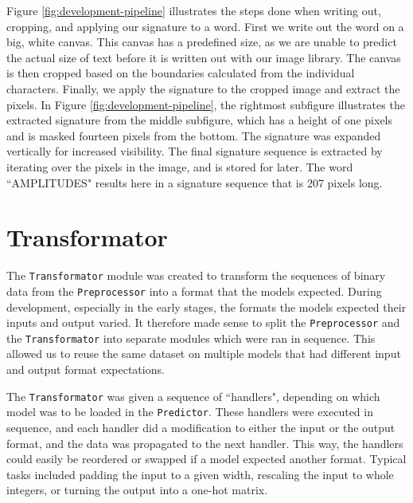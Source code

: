 Figure \ref{fig:development-pipeline} illustrates the steps done when writing out, cropping, and applying our signature to a word. First we write out the word on a big, white canvas. This canvas has a predefined size, as we are unable to predict the actual size of text before it is written out with our image library. The canvas is then cropped based on the boundaries calculated from the individual characters. Finally, we apply the signature to the cropped image and extract the pixels. In Figure \ref{fig:development-pipeline}, the rightmost subfigure illustrates the extracted signature from the middle subfigure, which has a height of one pixels and is masked fourteen pixels from the bottom. The signature was expanded vertically for increased visibility. The final signature sequence is extracted by iterating over the pixels in the image, and is stored for later. The word ``AMPLITUDES" results here in a signature sequence that is 207 pixels long.


\section{Transformator}
The {\tt Transformator} module was created to transform the sequences of binary data from the {\tt Preprocessor} into a format that the models expected. During development, especially in the early stages, the formats the models expected their inputs and output varied. It therefore made sense to split the {\tt Preprocessor} and the {\tt Transformator} into separate modules which were ran in sequence. This allowed us to reuse the same dataset on multiple models that had different input and output format expectations.

The {\tt Transformator} was given a sequence of ``handlers", depending on which model was to be loaded in the {\tt Predictor}. These handlers were executed in sequence, and each handler did a modification to either the input or the output format, and the data was propagated to the next handler. This way, the handlers could easily be reordered or swapped if a model expected another format. Typical tasks included padding the input to a given width, rescaling the input to whole integers, or turning the output into a one-hot matrix.

